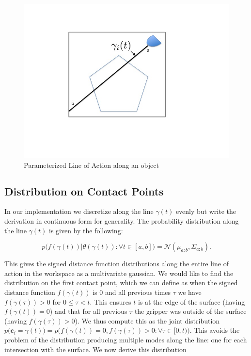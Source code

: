 \documentclass[letterpaper, 10 pt, conference]{ieeeconf}  %
\newcommand{\mN}{\mathcal{N}}
\begin{document}



\begin{figure}[ht!]
\centering
\includegraphics[scale = 0.3]{figures/Slide01.jpg}
\caption{Parameterized Line of Action along an object}
\vspace*{-10pt}
\label{fig:line_of_action}
\end{figure}
\subsection{Distribution on Contact Points} 
In our implementation we discretize along the line $\gamma(t)$ evenly but write the derivation in continuous form for generality.
The probability distribution along the line $\gamma(t)$ is given by the following:

\begin{equation}
p\big(f(\gamma(t))|\theta(\gamma(t)): \forall t \in [a,b] \big) 
=
\mN(\mu_{a:b},\Sigma_{a:b}).
\end{equation}

This gives the signed distance function distributions along the entire line of action in the workspace as a multivariate gaussian.
We would like to find the distribution on the first contact point, which we can define as when the signed distance function $f(\gamma(t))$ is $0$ and all previous times $\tau$ we have $f(\gamma(\tau)) > 0$ for $0 \leq \tau < t$.
This ensures $t$ is at the edge of the surface (having $f(\gamma(t)) = 0$) and that for all previous $\tau$ the gripper was outside of the surface (having $f(\gamma(\tau)) > 0$).
We thus compute this as the joint distribution $p\big(\textbf{c}_i= \gamma(t)\big) = p\big(f(\gamma(t))=0, f(\gamma(\tau))> 0: \forall \tau \in [0,t)\big)$.
This avoids the problem of the distribution producing multiple modes along the line: one for each intersection with the surface.
We now derive this distribution 
\end{document}
